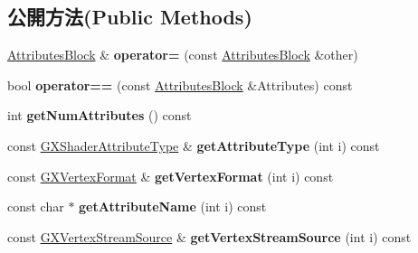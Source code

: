 \subsection*{公開方法(Public Methods)}
\begin{DoxyCompactItemize}
\item 
\hyperlink{class_magnum_1_1_attributes_block}{Attributes\+Block} \& {\bfseries operator=} (const \hyperlink{class_magnum_1_1_attributes_block}{Attributes\+Block} \&other)\hypertarget{class_magnum_1_1_attributes_block_a1436b864ff0a826e1112f592bfe34355}{}\label{class_magnum_1_1_attributes_block_a1436b864ff0a826e1112f592bfe34355}

\item 
bool {\bfseries operator==} (const \hyperlink{class_magnum_1_1_attributes_block}{Attributes\+Block} \&Attributes) const \hypertarget{class_magnum_1_1_attributes_block_acc7c693898005846fbea6aa9673f7466}{}\label{class_magnum_1_1_attributes_block_acc7c693898005846fbea6aa9673f7466}

\item 
int {\bfseries get\+Num\+Attributes} () const \hypertarget{class_magnum_1_1_attributes_block_a29489aea242cb4a7416bd3e14bbbf385}{}\label{class_magnum_1_1_attributes_block_a29489aea242cb4a7416bd3e14bbbf385}

\item 
const \hyperlink{class_magnum_1_1_g_x_shader_attribute_type}{G\+X\+Shader\+Attribute\+Type} \& {\bfseries get\+Attribute\+Type} (int i) const \hypertarget{class_magnum_1_1_attributes_block_ad53009dbfaed4b8f8bf02bffe30acdea}{}\label{class_magnum_1_1_attributes_block_ad53009dbfaed4b8f8bf02bffe30acdea}

\item 
const \hyperlink{class_magnum_1_1_g_x_vertex_format}{G\+X\+Vertex\+Format} \& {\bfseries get\+Vertex\+Format} (int i) const \hypertarget{class_magnum_1_1_attributes_block_ae9c92a9e56c3aab8bbc6ea6ce11278a3}{}\label{class_magnum_1_1_attributes_block_ae9c92a9e56c3aab8bbc6ea6ce11278a3}

\item 
const char $\ast$ {\bfseries get\+Attribute\+Name} (int i) const \hypertarget{class_magnum_1_1_attributes_block_a524bb5b1504231a5773e457d01e70cee}{}\label{class_magnum_1_1_attributes_block_a524bb5b1504231a5773e457d01e70cee}

\item 
const \hyperlink{class_magnum_1_1_g_x_vertex_stream_source}{G\+X\+Vertex\+Stream\+Source} \& {\bfseries get\+Vertex\+Stream\+Source} (int i) const \hypertarget{class_magnum_1_1_attributes_block_aae8e65e3a1ca1fd9e156f0cd03dda51b}{}\label{class_magnum_1_1_attributes_block_aae8e65e3a1ca1fd9e156f0cd03dda51b}


\end{DoxyCompactItemize}
